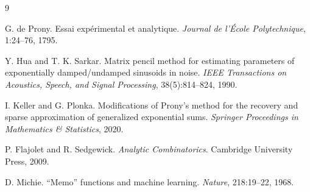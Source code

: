 \documentclass[10pt,twocolumn]{article}
\theoremstyle{cleanprop}
\begin{document}
\newpage
\begin{thebibliography}{9}
\small

G. de Prony.
Essai exp\'erimental et analytique.
\emph{Journal de l'\'Ecole Polytechnique}, 1:24--76, 1795.

Y. Hua and T. K. Sarkar.
Matrix pencil method for estimating parameters of exponentially
damped/undamped sinusoids in noise.
\emph{IEEE Transactions on Acoustics, Speech, and Signal Processing},
38(5):814--824, 1990.

I. Keller and G. Plonka.
Modifications of Prony's method for the recovery and sparse approximation of
generalized exponential sums.
\emph{Springer Proceedings in Mathematics \& Statistics}, 2020.

P. Flajolet and R. Sedgewick.
\emph{Analytic Combinatorics}.
Cambridge University Press, 2009.

D. Michie.
``Memo'' functions and machine learning.
\emph{Nature}, 218:19--22, 1968.

\end{thebibliography}
\end{document}
